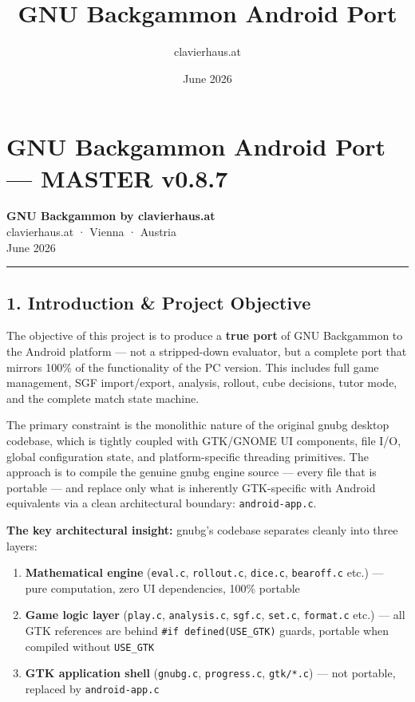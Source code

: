 \documentclass[11pt,a4paper]{article}
\title{\textbf{GNU Backgammon Android Port}}
\author{clavierhaus.at}
\date{June 2026}
\providecommand{\tightlist}{\setlength{\itemsep}{2pt}\setlength{\parskip}{0pt}}
\begin{document}
\maketitle\thispagestyle{fancy}

\tableofcontents\newpage

\section{GNU Backgammon Android Port --- MASTER v0.8.7}\label{gnu-backgammon-android-port-master-v085}

\textbf{GNU Backgammon by clavierhaus.at}\\
clavierhaus.at · Vienna · Austria\\
June 2026

\begin{center}\rule{0.5\linewidth}{0.5pt}\end{center}

\subsection{1. Introduction \& Project Objective}\label{introduction-project-objective}

The objective of this project is to produce a \textbf{true port} of GNU
Backgammon to the Android platform --- not a stripped-down evaluator,
but a complete port that mirrors 100\% of the functionality of the PC
version. This includes full game management, SGF import/export,
analysis, rollout, cube decisions, tutor mode, and the complete match
state machine.

The primary constraint is the monolithic nature of the original gnubg
desktop codebase, which is tightly coupled with GTK/GNOME UI components,
file I/O, global configuration state, and platform-specific threading
primitives. The approach is to compile the genuine gnubg engine source
--- every file that is portable --- and replace only what is inherently
GTK-specific with Android equivalents via a clean architectural
boundary: \texttt{android-app.c}.

\textbf{The key architectural insight:} gnubg's codebase separates
cleanly into three layers:

\begin{enumerate}
\def\labelenumi{\arabic{enumi}.}
\tightlist
\item
  \textbf{Mathematical engine} (\texttt{eval.c}, \texttt{rollout.c},
  \texttt{dice.c}, \texttt{bearoff.c} etc.) --- pure computation, zero
  UI dependencies, 100\% portable
\item
  \textbf{Game logic layer} (\texttt{play.c}, \texttt{analysis.c},
  \texttt{sgf.c}, \texttt{set.c}, \texttt{format.c} etc.) --- all GTK
  references are behind \texttt{\#if\ defined(USE\_GTK)} guards,
  portable when compiled without \texttt{USE\_GTK}
\item
  \textbf{GTK application shell} (\texttt{gnubg.c}, \texttt{progress.c},
  \texttt{gtk/*.c}) --- not portable, replaced by \texttt{android-app.c}
\end{enumerate}
\end{document}
